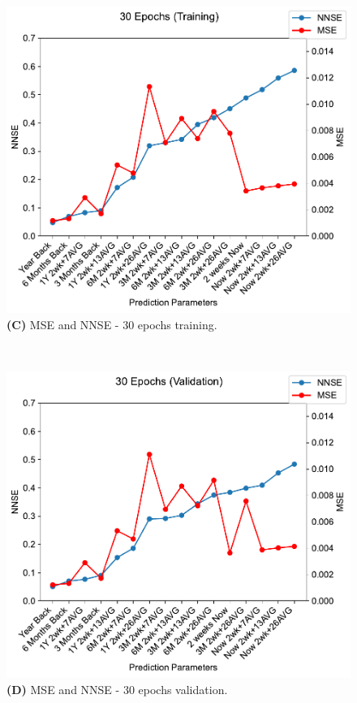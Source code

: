 \documentclass[utf8]{FrontiersinVancouver} %
\begin{document}
\begin{figure}[htb]
\begin{center}
     \begin{minipage}[b]{0.45\textwidth}
        \includegraphics[width=1.0\linewidth]{images/30_training-MSE-and-NNSE.pdf}
        {\bf (C)} MSE and NNSE - 30 epochs training.
     \end{minipage}
     \ \
     \begin{minipage}[b]{0.45\textwidth}
        \includegraphics[width=1.0\linewidth]{images/30_validation-MSE-and-NNSE.pdf}
        {\bf (D)} MSE and NNSE - 30 epochs validation.
     \end{minipage}


\end{center}
\end{figure}
\end{document}
